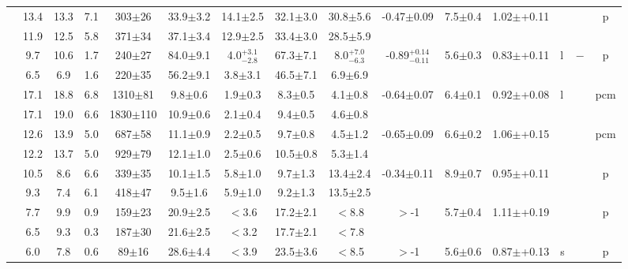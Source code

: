 \documentclass[iop,revtex4]{emulateapj}
\newcommand\M{\rule{0pt}{2.3ex}}
\newcommand\U{\rule{0pt}{3.2ex}}       %
\begin{document}
\begin{landscape}
{\begin{longtable}{ccccccccccccp{0.25in}p{0.25in}c}
\U\multirow{2}{*}{9}&13.4&13.3&7.1&303$\pm$26&33.9$\pm$3.2&14.1$\pm$2.5&32.1$\pm$3.0&30.8$\pm$5.6&\multirow{2}{*}{-0.47$\pm$0.09}&\multirow{2}{*}{7.5$\pm$0.4}&\multirow{2}{*}{1.02$\pm$+0.11}&\multirow{2}{*}{}&\multirow{2}{*}{}&\multirow{2}{*}{p}\\
\M&11.9&12.5&5.8&371$\pm$34&37.1$\pm$3.4&12.9$\pm$2.5&33.4$\pm$3.0&28.5$\pm$5.9&&&&&&\\
\U\multirow{2}{*}{10}&9.7&10.6&1.7&240$\pm$27&84.0$\pm$9.1&4.0$^{+3.1}_{-2.8}$&67.3$\pm$7.1&8.0$^{+7.0}_{-6.3}$&\multirow{2}{*}{-0.89$^{+0.14}_{-0.11}$}&\multirow{2}{*}{5.6$\pm$0.3}&\multirow{2}{*}{0.83$\pm$+0.11}&\multirow{2}{*}{l}&\multirow{2}{*}{$-$}&\multirow{2}{*}{p}\\
\M&6.5&6.9&1.6&220$\pm$35&56.2$\pm$9.1&3.8$\pm$3.1&46.5$\pm$7.1&6.9$\pm$6.9&&&&&&\\
\U\multirow{2}{*}{11}&17.1&18.8&6.8&1310$\pm$81&9.8$\pm$0.6&1.9$\pm$0.3&8.3$\pm$0.5&4.1$\pm$0.8&\multirow{2}{*}{-0.64$\pm$0.07}&\multirow{2}{*}{6.4$\pm$0.1}&\multirow{2}{*}{0.92$\pm$+0.08}&\multirow{2}{*}{l}&\multirow{2}{*}{}&\multirow{2}{*}{pcm}\\
\M&17.1&19.0&6.6&1830$\pm$110&10.9$\pm$0.6&2.1$\pm$0.4&9.4$\pm$0.5&4.6$\pm$0.8&&&&&&\\
\U\multirow{2}{*}{12}&12.6&13.9&5.0&687$\pm$58&11.1$\pm$0.9&2.2$\pm$0.5&9.7$\pm$0.8&4.5$\pm$1.2&\multirow{2}{*}{-0.65$\pm$0.09}&\multirow{2}{*}{6.6$\pm$0.2}&\multirow{2}{*}{1.06$\pm$+0.15}&\multirow{2}{*}{}&\multirow{2}{*}{}&\multirow{2}{*}{pcm}\\
\M&12.2&13.7&5.0&929$\pm$79&12.1$\pm$1.0&2.5$\pm$0.6&10.5$\pm$0.8&5.3$\pm$1.4&&&&&&\\
\U\multirow{2}{*}{13}&10.5&8.6&6.6&339$\pm$35&10.1$\pm$1.5&5.8$\pm$1.0&9.7$\pm$1.3&13.4$\pm$2.4&\multirow{2}{*}{-0.34$\pm$0.11}&\multirow{2}{*}{8.9$\pm$0.7}&\multirow{2}{*}{0.95$\pm$+0.11}&\multirow{2}{*}{}&\multirow{2}{*}{}&\multirow{2}{*}{p}\\
\M&9.3&7.4&6.1&418$\pm$47&9.5$\pm$1.6&5.9$\pm$1.0&9.2$\pm$1.3&13.5$\pm$2.5&&&&&&\\
\U\multirow{2}{*}{14}&7.7&9.9&0.9&159$\pm$23&20.9$\pm$2.5&$<$3.6&17.2$\pm$2.1&$<$8.8&\multirow{2}{*}{$>$-1}&\multirow{2}{*}{5.7$\pm$0.4}&\multirow{2}{*}{1.11$\pm$+0.19}&\multirow{2}{*}{}&\multirow{2}{*}{}&\multirow{2}{*}{p}\\
\M&6.5&9.3&0.3&187$\pm$30&21.6$\pm$2.5&$<$3.2&17.7$\pm$2.1&$<$7.8&&&&&&\\
\U\multirow{2}{*}{15}&6.0&7.8&0.6&89$\pm$16&28.6$\pm$4.4&$<$3.9&23.5$\pm$3.6&$<$8.5&\multirow{2}{*}{$>$-1}&\multirow{2}{*}{5.6$\pm$0.6}&\multirow{2}{*}{0.87$\pm$+0.13}&\multirow{2}{*}{s}&\multirow{2}{*}{}&\multirow{2}{*}{p}\\

\end{longtable}}
\end{landscape}
\end{document}
